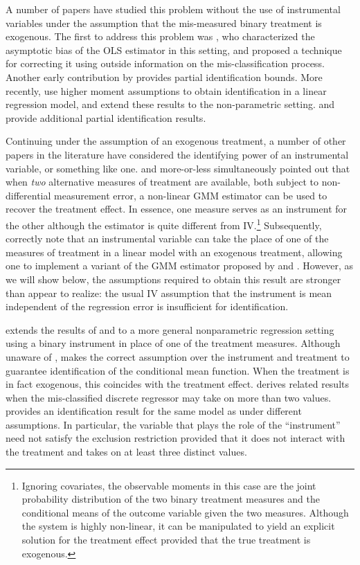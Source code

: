 A number of papers have studied this problem without the use of instrumental variables under the assumption that the mis-measured binary treatment is exogenous.
The first to address this problem was \cite{Aigner}, who characterized the asymptotic bias of the OLS estimator in this setting, and proposed a technique for correcting it using outside information on the mis-classification process.
Another early contribution by \cite{Bollinger} provides partial identification bounds.
More recently, \cite{ChenHuLewbel} use higher moment assumptions to obtain identification in a linear regression model, and \cite{ChenHuLewbel2} extend these results to the non-parametric setting. 
\cite{HasseltBollinger} and \cite{BollingerHasseltWP} provide additional partial identification results.

Continuing under the assumption of an exogenous treatment, a number of other papers in the literature have considered the identifying power of an instrumental variable, or something like one.
\cite{BBS} and \cite{KRS} more-or-less simultaneously pointed out that when \emph{two} alternative measures of treatment are available, both subject to non-differential measurement error, a non-linear GMM estimator can be used to recover the treatment effect.
In essence, one measure serves as an instrument for the other although the estimator is quite different from IV.\footnote{Ignoring covariates, the observable moments in this case are the joint probability distribution of the two binary treatment measures and the conditional means of the outcome variable given the two measures. Although the system is highly non-linear, it can be manipulated to yield an explicit solution for the treatment effect provided that the true treatment is exogenous.}
Subsequently, \cite{FL} correctly note that an instrumental variable can take the place of one of the measures of treatment in a linear model with an exogenous treatment, allowing one to implement a variant of the GMM estimator proposed by \cite{BBS} and \cite{KRS}.
However, as we will show below, the assumptions required to obtain this result are stronger than \cite{FL} appear to realize: the usual IV assumption that the instrument is mean independent of the regression error is insufficient for identification. 

\cite{Mahajan} extends the results of \cite{BBS} and \cite{KRS} to a more general nonparametric regression setting using a binary instrument in place of one of the treatment measures. 
Although unaware of \cite{FL}, \cite{Mahajan} makes the correct assumption over the instrument and treatment to guarantee identification of the conditional mean function.
When the treatment is in fact exogenous, this coincides with the treatment effect.
\cite{hu2008} derives related results when the mis-classified discrete regressor may take on more than two values.
\cite{Lewbel} provides an identification result for the same model as \cite{Mahajan} under different assumptions.
In particular, the variable that plays the role of the ``instrument'' need not satisfy the exclusion restriction provided that it does not interact with the treatment and takes on at least three distinct values. 

